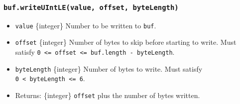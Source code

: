 \begin{Shaded}
\begin{Highlighting}[]
\NormalTok{ \{ }\NormalTok{ \} } \OperatorTok{;}

\OperatorTok{=} \NormalTok{(}\NormalTok{)}\OperatorTok{;}

\NormalTok{(}\OperatorTok{,} \OperatorTok{,} \NormalTok{)}\OperatorTok{;}

\OperatorTok{;}
\end{Highlighting}
\end{Shaded}

\begin{Shaded}
\begin{Highlighting}[]
\NormalTok{ \{ }\NormalTok{ \} }\OperatorTok{=} \NormalTok{(}\NormalTok{)}\OperatorTok{;}

\OperatorTok{=} \NormalTok{(}\NormalTok{)}\OperatorTok{;}

\NormalTok{(}\OperatorTok{,} \OperatorTok{,} \NormalTok{)}\OperatorTok{;}

\OperatorTok{;}
\end{Highlighting}
\end{Shaded}

\subsubsection{\texorpdfstring{\texttt{buf.writeUIntLE(value,\ offset,\ byteLength)}}{buf.writeUIntLE(value, offset, byteLength)}}\label{buf.writeuintlevalue-offset-bytelength}

\begin{itemize}
\tightlist
\item
  \texttt{value} \{integer\} Number to be written to \texttt{buf}.
\item
  \texttt{offset} \{integer\} Number of bytes to skip before starting to
  write. Must satisfy
  \texttt{0\ \textless{}=\ offset\ \textless{}=\ buf.length\ -\ byteLength}.
\item
  \texttt{byteLength} \{integer\} Number of bytes to write. Must satisfy
  \texttt{0\ \textless{}\ byteLength\ \textless{}=\ 6}.
\item
  Returns: \{integer\} \texttt{offset} plus the number of bytes written.
\end{itemize}

